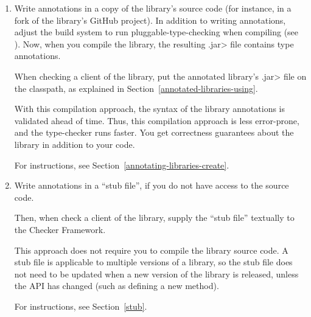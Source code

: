 \begin{enumerate}
\item
  Write annotations in a copy of the library's source code (for instance,
  in a fork of the library's GitHub project).  In addition to writing
  annotations, adjust the build system to run pluggable-type-checking when
  compiling (see ).  Now, when you compile
  the library, the resulting \<.jar> file contains type annotations.

  When checking a client of the library,
  put the annotated library's \<.jar> file on the classpath, as explained in
  Section~\ref{annotated-libraries-using}.


  With this compilation approach, the syntax of the library annotations is
  validated ahead of time.  Thus, this compilation approach is less
  error-prone, and the type-checker runs faster.  You get
  correctness guarantees about the library in addition to your code.

  For instructions, see Section~\ref{annotating-libraries-create}.

\item
  Write annotations in a ``stub file'', if you do not have access to the
  source code.

  Then, when check a client of the library,
  supply the ``stub file'' textually to the Checker Framework.

  This approach does not require you to compile the library source
  code.
  A stub file is applicable to multiple versions of a library, so
  the stub file does not need to be updated when a new version of the
  library is released, unless the API has changed (such as defining a new
  method).

  For instructions, see Section~\ref{stub}.

\end{enumerate}


